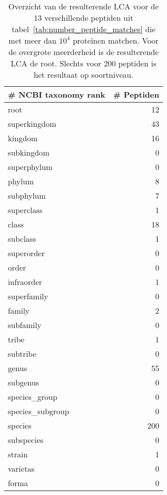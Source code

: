 \begin{table}[h!]
    \centering
    \begin{tabular}{|l|r|}
        \hline
        \textbf{\# NCBI taxonomy rank} & \textbf{\# Peptiden} \\ \hline
        root & 12\thinspace369 \\ \hline
        superkingdom & 43 \\ \hline
        kingdom & 16 \\ \hline
        subkingdom & 0 \\ \hline
        superphylum & 0 \\ \hline
        phylum & 8 \\ \hline
        subphylum & 7 \\ \hline
        superclass & 1 \\ \hline
        class & 18 \\ \hline
        subclass & 1 \\ \hline
        superorder & 0 \\ \hline
        order & 0 \\ \hline
        infraorder & 1 \\ \hline
        superfamily & 0 \\ \hline
        family & 2 \\ \hline
        subfamily & 0 \\ \hline
        tribe & 1 \\ \hline
        subtribe & 0 \\ \hline
        genus & 55 \\ \hline
        subgenus & 0 \\ \hline
        species\_group & 0 \\ \hline
        species\_subgroup & 0 \\ \hline
        species & 200 \\ \hline
        subspecies & 0 \\ \hline
        strain & 1 \\ \hline
        varietas & 0 \\ \hline
        forma & 0 \\ \hline
    \end{tabular}
    \caption{Overzicht van de resulterende LCA voor de 13 verschillende peptiden uit tabel~\ref{tab:number_peptide_matches} die met meer dan $10^4$ proteïnen matchen. Voor de overgrote meerderheid is de resulterende LCA de root. Slechts voor 200 peptiden is het resultaat op soortniveau.}
    \label{tab:peptides_distribution}
\end{table}

